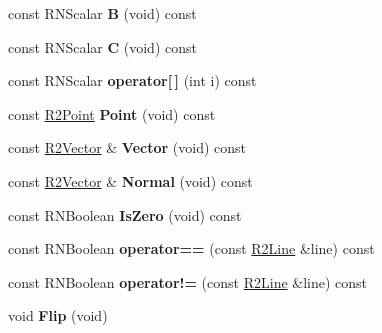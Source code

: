 \begin{DoxyCompactItemize}
\item 
const R\+N\+Scalar {\bfseries B} (void) const \hypertarget{class_r2_line_a1466b628db2cdedf79a83c80f03cabd3}{}\label{class_r2_line_a1466b628db2cdedf79a83c80f03cabd3}

\item 
const R\+N\+Scalar {\bfseries C} (void) const \hypertarget{class_r2_line_ae714f64fa74d0856d3a4400ad7b22415}{}\label{class_r2_line_ae714f64fa74d0856d3a4400ad7b22415}

\item 
const R\+N\+Scalar {\bfseries operator\mbox{[}$\,$\mbox{]}} (int i) const \hypertarget{class_r2_line_aff3881bd1b2184e289e2613cb93bdce7}{}\label{class_r2_line_aff3881bd1b2184e289e2613cb93bdce7}

\item 
const \hyperlink{class_r2_point}{R2\+Point} {\bfseries Point} (void) const \hypertarget{class_r2_line_a059a7cb8c7d97159c43769dde99f0e27}{}\label{class_r2_line_a059a7cb8c7d97159c43769dde99f0e27}

\item 
const \hyperlink{class_r2_vector}{R2\+Vector} \& {\bfseries Vector} (void) const \hypertarget{class_r2_line_a0c0da834757bcdd2517b55ffc050c9a7}{}\label{class_r2_line_a0c0da834757bcdd2517b55ffc050c9a7}

\item 
const \hyperlink{class_r2_vector}{R2\+Vector} \& {\bfseries Normal} (void) const \hypertarget{class_r2_line_a9b5d887c062f934536230ca2e5b1a50c}{}\label{class_r2_line_a9b5d887c062f934536230ca2e5b1a50c}

\item 
const R\+N\+Boolean {\bfseries Is\+Zero} (void) const \hypertarget{class_r2_line_aa78e096eff1c49912d01d5824ddef81b}{}\label{class_r2_line_aa78e096eff1c49912d01d5824ddef81b}

\item 
const R\+N\+Boolean {\bfseries operator==} (const \hyperlink{class_r2_line}{R2\+Line} \&line) const \hypertarget{class_r2_line_a6ebd3311778fbcc39f3af3f3550950dc}{}\label{class_r2_line_a6ebd3311778fbcc39f3af3f3550950dc}

\item 
const R\+N\+Boolean {\bfseries operator!=} (const \hyperlink{class_r2_line}{R2\+Line} \&line) const \hypertarget{class_r2_line_a8f06b822c9c4fe40a7b131fcc256c948}{}\label{class_r2_line_a8f06b822c9c4fe40a7b131fcc256c948}

\item 
void {\bfseries Flip} (void)\hypertarget{class_r2_line_adda3ea513af78763c3da530578528c55}{}\label{class_r2_line_adda3ea513af78763c3da530578528c55}


\end{DoxyCompactItemize}
